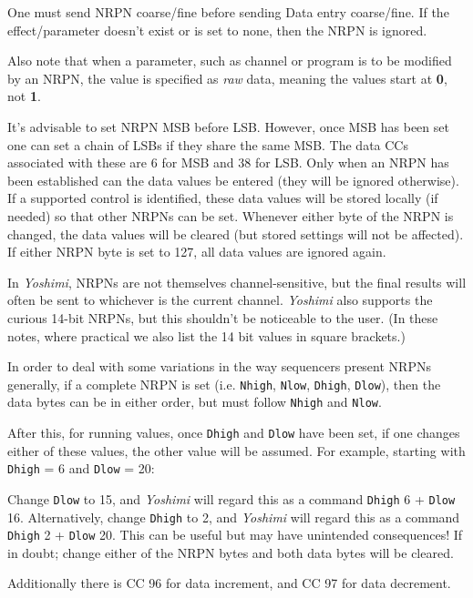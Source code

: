    One must send NRPN coarse/fine before sending Data entry coarse/fine.  If
   the effect/parameter doesn't exist or is set to none, then the NRPN is
   ignored.

   Also note that when a parameter, such as channel or program is to be modified
   by an NRPN, the value is specified as \textsl{raw} data, meaning the values
   start at \textbf{0}, not \textbf{1}.

   It's advisable to set NRPN MSB before LSB. However, once MSB has
   been set one can set a chain of LSBs if they share the same MSB.
   The data CCs associated with these are 6 for MSB and 38 for LSB.
   Only when an NRPN has been established can the data values be entered
   (they will be ignored otherwise).
   If a supported control is identified, these data values will be stored
   locally (if needed) so that other NRPNs can be set.
   Whenever either byte of the NRPN is changed, the data values will be
   cleared (but stored settings will not be affected).
   If either NRPN byte is set to 127, all data values are ignored again.

   In \textsl{Yoshimi}, NRPNs are not themselves channel-sensitive, but the
   final results will often be sent to whichever is the current channel.
   \textsl{Yoshimi} also supports the curious 14-bit NRPNs, but this shouldn't
   be noticeable to the user.
   (In these notes, where practical we also list the 14 bit values in square
   brackets.)

   In order to deal with some
   variations in the way sequencers present NRPNs generally, if a complete
   NRPN is set
   (i.e. \texttt{Nhigh}, \texttt{Nlow}, \texttt{Dhigh}, \texttt{Dlow}),
   then the data bytes can be in
   either order, but must follow \texttt{Nhigh} and \texttt{Nlow}.

   After this, for running values, once
   \texttt{Dhigh} and \texttt{Dlow} have been set, if one
   changes either of these values, the other value will be assumed.
   For example, starting with \texttt{Dhigh} = 6 and \texttt{Dlow} = 20:

   Change \texttt{Dlow} to 15, and \textsl{Yoshimi} will regard this as a
   command \texttt{Dhigh} 6 + \texttt{Dlow} 16.
   Alternatively, change
   \texttt{Dhigh} to 2, and \textsl{Yoshimi} will regard this as a
   command \texttt{Dhigh} 2 + \texttt{Dlow} 20.
   This can be useful but may have unintended consequences!
   If in doubt; change either of the NRPN bytes and both data bytes will be
   cleared.

   Additionally there is CC 96 for data increment, and CC 97 for data
   decrement.

